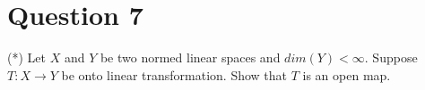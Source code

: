 \section{Question 7}
\horz
(*) Let $X$ and $Y$ be two normed linear spaces and $dim (Y) < \infty$. Suppose $T: X \rightarrow Y$ be onto linear transformation. Show that $T$ is an open map.
\horz
